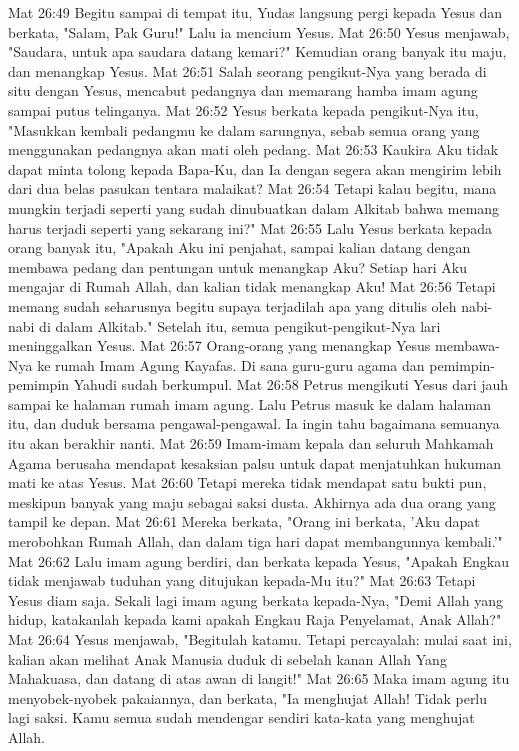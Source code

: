 Mat 26:49  Begitu sampai di tempat itu, Yudas langsung pergi kepada Yesus dan berkata, "Salam, Pak Guru!" Lalu ia mencium Yesus.
Mat 26:50  Yesus menjawab, "Saudara, untuk apa saudara datang kemari?" Kemudian orang banyak itu maju, dan menangkap Yesus.
Mat 26:51  Salah seorang pengikut-Nya yang berada di situ dengan Yesus, mencabut pedangnya dan memarang hamba imam agung sampai putus telinganya.
Mat 26:52  Yesus berkata kepada pengikut-Nya itu, "Masukkan kembali pedangmu ke dalam sarungnya, sebab semua orang yang menggunakan pedangnya akan mati oleh pedang.
Mat 26:53  Kaukira Aku tidak dapat minta tolong kepada Bapa-Ku, dan Ia dengan segera akan mengirim lebih dari dua belas pasukan tentara malaikat?
Mat 26:54  Tetapi kalau begitu, mana mungkin terjadi seperti yang sudah dinubuatkan dalam Alkitab bahwa memang harus terjadi seperti yang sekarang ini?"
Mat 26:55  Lalu Yesus berkata kepada orang banyak itu, "Apakah Aku ini penjahat, sampai kalian datang dengan membawa pedang dan pentungan untuk menangkap Aku? Setiap hari Aku mengajar di Rumah Allah, dan kalian tidak menangkap Aku!
Mat 26:56  Tetapi memang sudah seharusnya begitu supaya terjadilah apa yang ditulis oleh nabi-nabi di dalam Alkitab." Setelah itu, semua pengikut-pengikut-Nya lari meninggalkan Yesus.
Mat 26:57  Orang-orang yang menangkap Yesus membawa-Nya ke rumah Imam Agung Kayafas. Di sana guru-guru agama dan pemimpin-pemimpin Yahudi sudah berkumpul.
Mat 26:58  Petrus mengikuti Yesus dari jauh sampai ke halaman rumah imam agung. Lalu Petrus masuk ke dalam halaman itu, dan duduk bersama pengawal-pengawal. Ia ingin tahu bagaimana semuanya itu akan berakhir nanti.
Mat 26:59  Imam-imam kepala dan seluruh Mahkamah Agama berusaha mendapat kesaksian palsu untuk dapat menjatuhkan hukuman mati ke atas Yesus.
Mat 26:60  Tetapi mereka tidak mendapat satu bukti pun, meskipun banyak yang maju sebagai saksi dusta. Akhirnya ada dua orang yang tampil ke depan.
Mat 26:61  Mereka berkata, "Orang ini berkata, 'Aku dapat merobohkan Rumah Allah, dan dalam tiga hari dapat membangunnya kembali.'"
Mat 26:62  Lalu imam agung berdiri, dan berkata kepada Yesus, "Apakah Engkau tidak menjawab tuduhan yang ditujukan kepada-Mu itu?"
Mat 26:63  Tetapi Yesus diam saja. Sekali lagi imam agung berkata kepada-Nya, "Demi Allah yang hidup, katakanlah kepada kami apakah Engkau Raja Penyelamat, Anak Allah?"
Mat 26:64  Yesus menjawab, "Begitulah katamu. Tetapi percayalah: mulai saat ini, kalian akan melihat Anak Manusia duduk di sebelah kanan Allah Yang Mahakuasa, dan datang di atas awan di langit!"
Mat 26:65  Maka imam agung itu menyobek-nyobek pakaiannya, dan berkata, "Ia menghujat Allah! Tidak perlu lagi saksi. Kamu semua sudah mendengar sendiri kata-kata yang menghujat Allah.
